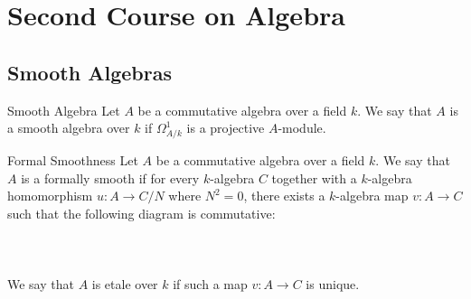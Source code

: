 \documentclass[a4paper]{article}
\begin{document}
\pagebreak
\section{Second Course on Algebra}
\subsection{Smooth Algebras}
\begin{defn}{Smooth Algebra}{} Let $A$ be a commutative algebra over a field $k$. We say that $A$ is a smooth algebra over $k$ if $\Omega_{A/k}^1$ is a projective $A$-module. 
\end{defn}

\begin{defn}{Formal Smoothness}{} Let $A$ be a commutative algebra over a field $k$. We say that $A$ is a formally smooth if for every $k$-algebra $C$ together with a $k$-algebra homomorphism $u:A\to C/N$ where $N^2=0$, there exists a $k$-algebra map $v:A\to C$ such that the following diagram is commutative:  \\~\\
\\~\\
We say that $A$ is etale over $k$ if such a map $v:A\to C$ is unique. 
\end{defn}
\end{document}
